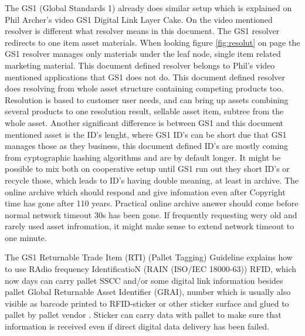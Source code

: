 The GS1 (Global Standards 1) already does similar setup which is explained on
Phil Archer's video GS1 Digital Link Layer Cake\cite{GS1DigitalLink}. On the
video mentioned resolver is different what resolver means in this document.
The GS1 resolver redirects to one item asset materials. When looking figure
\ref{fig:resolut} on page \pageref{fig:resolut} the GS1 resolver manages only
materials under the leaf node, single item related marketing material. This
document defined resolver belongs to Phil's video mentioned applications that
GS1 does not do. This document defined resolver does resolving from whole
asset structure containing competing products too. Resolution is based to
customer user needs, and  can bring up assets combining several products to one
resolution result, sellable asset item, subtree from the whole asset. Another
significant difference is between GS1 and this document mentioned asset is the
ID's lenght, where GS1 ID's can be short due that GS1 manages those as they
business, this document defined ID's are mostly coming from cyptographic
hashing algorithms\cite{CompHashFunc} and are by default longer.
It might be possible to mix both on cooperative setup until GS1 run out they
short ID's or recycle those, which leads to ID's having double meaning, at
least in archive. The online archive which should respond and give infomation
even after Copyright time \cite{CopyrightLengths} has gone after 110 years.
Practical online archive answer should come before normal network timeout 30s
has been gone. If frequently requesting wery old and rarely used asset
infromation, it might make sense to extend network timeout to one minute. 

The GS1 Returnable Trade Item (RTI) (Pallet Tagging) Guideline\cite{RTIguideline}
explains how to use RAdio frequency IdentificatioN (RAIN (ISO/IEC 18000-63))
RFID\cite{UHFforRAIN}, which now days can carry pallet SSCC and/or some digital
link information besides pallet Global Returnable Asset Identifier (GRAI),
number which is usually also visible as barcode printed to RFID-sticker
or other sticker surface and glued to pallet by pallet vendor
\cite{EPalIPal}\cite{AllGreenPallets}\cite{iGpsRFID}\cite{SRSpallets}\cite{CramerRFIDoption}\cite{ChepIcoQube}.
Sticker can carry data with pallet to make sure that information
is received even if direct digital data delivery has been failed.

